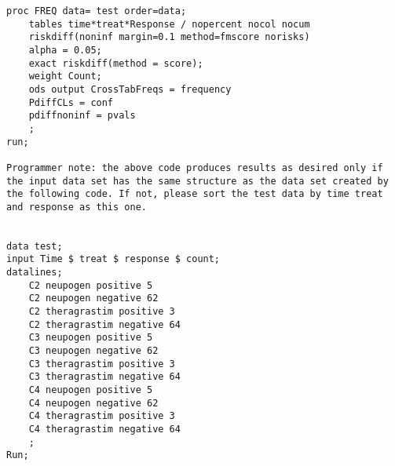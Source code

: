 \documentclass[]{article}
\begin{document}
\begin{verbatim}
proc FREQ data= test order=data;
    tables time*treat*Response / nopercent nocol nocum
    riskdiff(noninf margin=0.1 method=fmscore norisks)
    alpha = 0.05;
    exact riskdiff(method = score);
    weight Count;
    ods output CrossTabFreqs = frequency
    PdiffCLs = conf
    pdiffnoninf = pvals
    ;
run;

Programmer note: the above code produces results as desired only if
the input data set has the same structure as the data set created by
the following code. If not, please sort the test data by time treat
and response as this one.


data test;
input Time $ treat $ response $ count;
datalines;
    C2 neupogen positive 5
    C2 neupogen negative 62
    C2 theragrastim positive 3
    C2 theragrastim negative 64
    C3 neupogen positive 5
    C3 neupogen negative 62
    C3 theragrastim positive 3
    C3 theragrastim negative 64
    C4 neupogen positive 5
    C4 neupogen negative 62
    C4 theragrastim positive 3
    C4 theragrastim negative 64
    ;
Run;
\end{verbatim}


\end{document}
